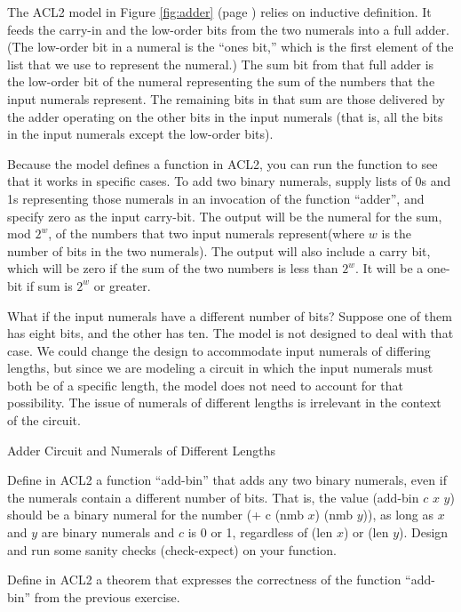 The ACL2 model in Figure \ref{fig:adder} (page \pageref{fig:adder}) relies
on inductive definition. It feeds the carry-in and
the low-order bits from the two numerals into a full adder.
(The low-order bit in a numeral is the ``ones bit,''
which is the first element of the list that we use to
represent the numeral.)
The sum bit from that full adder
is the low-order bit of the numeral representing the sum of
the numbers that the input numerals represent.
The remaining bits in that sum are those delivered by
the adder operating on the other bits in the input numerals
(that is, all the bits in the input numerals except the low-order bits).

Because the model defines a function in ACL2,
you can run the function to see that it works in specific cases.
To add two binary numerals, supply lists of 0s and 1s
representing those numerals in an invocation
of the function ``adder'', and specify zero as the input carry-bit.
The output will be the numeral for the sum, mod $2^w$,
of the numbers that two input
numerals represent(where $w$ is the number of bits in the two numerals).
The output will also include a carry bit,
which will be zero if the sum of the two numbers is less than $2^w$.
It will be a one-bit if sum is $2^w$ or greater.

\begin{aside}
What if the input numerals have a different number of bits?
Suppose one of them has eight bits, and the other has ten.
The model is not designed to deal with that case.
We could change the design to accommodate input numerals
of differing lengths, but since we are modeling a circuit
in which the input numerals must both be of a specific length,
the model does not need to account for that possibility.
The issue of numerals of different lengths
is irrelevant in the context of the circuit.
\caption{Adder Circuit and Numerals of Different Lengths}
\label{adder-circuit-and-numerals-of-different-lengths}
\end{aside}

\begin{ExerciseList}
\Exercise Define in ACL2 a function ``add-bin''
that adds any two binary numerals,
even if the numerals contain a different number of bits.
That is, the value (add-bin $c$ $x$ $y$) should be a binary numeral
for the number (+ c (nmb $x$) (nmb $y$)),
as long as $x$ and $y$ are binary numerals and $c$ is 0 or 1,
regardless of (len $x$) or (len $y$).
Design and run some sanity checks (check-expect) on your function.

\Exercise Define in ACL2 a theorem that expresses the correctness
of the function ``add-bin'' from the previous exercise.
\end{ExerciseList}

